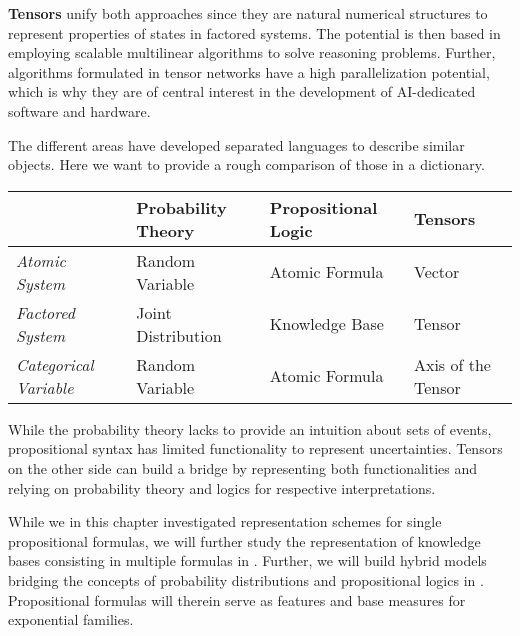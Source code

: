 \textbf{Tensors} unify both approaches since they are natural numerical structures to represent properties of states in factored systems.
The potential is then based in employing scalable multilinear algorithms to solve reasoning problems.
Further, algorithms formulated in tensor networks have a high parallelization potential, which is why they are of central interest in the development of AI-dedicated software and hardware.

The different areas have developed separated languages to describe similar objects.
Here we want to provide a rough comparison of those in a dictionary.

\begin{tabular}{l|l|l|l}
    & \textbf{Probability Theory} & \textbf{Propositional Logic} & \textbf{Tensors}   \\
    \hline
    \textit{Atomic System}        & Random Variable             & Atomic Formula               & Vector             \\
    \textit{Factored System}      & Joint Distribution          & Knowledge Base               & Tensor             \\
    \textit{Categorical Variable} & Random Variable             & Atomic Formula               & Axis of the Tensor
\end{tabular}

While the probability theory lacks to provide an intuition about sets of events, propositional syntax has limited functionality to represent uncertainties.
Tensors on the other side can build a bridge by representing both functionalities and relying on probability theory and logics for respective interpretations.



While we in this chapter investigated representation schemes for single propositional formulas, we will further study the representation of knowledge bases consisting in multiple formulas in .
Further, we will build hybrid models bridging the concepts of probability distributions and propositional logics in .
Propositional formulas will therein serve as features and base measures for exponential families.
